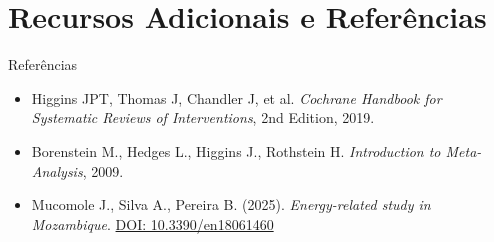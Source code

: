 \documentclass[12pt]{beamer}
\begin{document}
\section{Recursos Adicionais e Referências}
\begin{frame}{Referências}
\begin{itemize}
    \item Higgins JPT, Thomas J, Chandler J, et al. \textit{Cochrane Handbook for Systematic Reviews of Interventions}, 2nd Edition, 2019.
    \item Borenstein M., Hedges L., Higgins J., Rothstein H. \textit{Introduction to Meta-Analysis}, 2009.
    \item Mucomole J., Silva A., Pereira B. (2025). \textit{Energy-related study in Mozambique}. \href{https://doi.org/10.3390/en18061460}{DOI: 10.3390/en18061460}
\end{itemize}
\end{frame}
\end{document}
